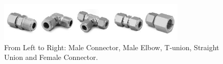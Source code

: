 \documentclass[a4paper,12pt,oneside]{article}
\providecommand{\DIFdelbeginFL}{} %
\newcommand{\DIFscaledelfig}{0.5}
\newlength{\DIFdelgraphicswidth} %
\newlength{\DIFdelgraphicsheight} %
\newcommand{\DIFdelincludegraphics}[2][]{%
\sbox{\DIFdelgraphicsbox}{\DIFOincludegraphics[#1]{#2}}%
\settoboxwidth{\DIFdelgraphicswidth}{\DIFdelgraphicsbox} %
\settoboxtotalheight{\DIFdelgraphicsheight}{\DIFdelgraphicsbox} %
\scalebox{\DIFscaledelfig}{%
\parbox[b]{\DIFdelgraphicswidth}{\usebox{\DIFdelgraphicsbox}\\[-\baselineskip] \rule{\DIFdelgraphicswidth}{0em}}\llap{\resizebox{\DIFdelgraphicswidth}{\DIFdelgraphicsheight}{%
\setlength{\unitlength}{\DIFdelgraphicswidth}%
\begin{picture}(1,1)%
\thicklines\linethickness{2pt} %
{\color[rgb]{1,0,0}\put(0,0){\framebox(1,1){}}}%
{\color[rgb]{1,0,0}\put(0,0){\line( 1,1){1}}}%
{\color[rgb]{1,0,0}\put(0,1){\line(1,-1){1}}}%
\end{picture}%
}\hspace*{3pt}}} %
} %
\DeclareRobustCommand{\DIFdelbeginFL}{\DIFOdelbeginFL \let\includegraphics\DIFdelincludegraphics} %
\begin{document}
\begin{figure}[H]
    \centering
    \includegraphics[width=0.8\textwidth]{4-experiment-design/img/Mechanical/AAC-interfaces.jpg}
    \caption{From Left to Right: Male Connector, Male Elbow, T-union, Straight Union and Female Connector.}
    \label{fig:AAC-interfaces-fittings}
\end{figure}

\begin{table}[H]
\centering
\DIFdelbeginFL %

\end{table}
\end{document}
